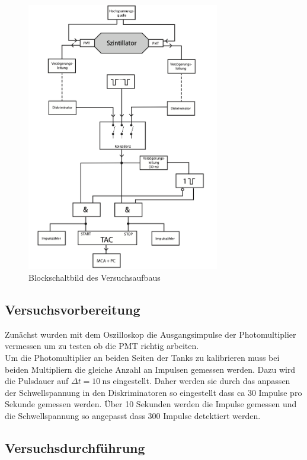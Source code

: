 \begin{figure}[H]
    \centering
    \includegraphics[width = 0.75\textwidth]{./bilder/Schaltbild.png}
    \caption{Blockschaltbild des Versuchsaufbaus \cite{anleitung}}
    \label{fig:schaltbild}
\end{figure}
\subsection{Versuchsvorbereitung}
Zunächst wurden mit dem Oszilloskop die Ausgangsimpulse der Photomultiplier vermessen um zu testen ob die PMT richtig arbeiten.\\
Um die Photomultiplier an beiden Seiten der Tanks zu kalibrieren muss bei beiden Multipliern die gleiche Anzahl an Impulsen gemessen werden.
Dazu wird die Pulsdauer auf $\Delta t = \SI{10}{\nano\second}$  eingestellt.
Daher werden sie durch das anpassen der Schwellspannung in den Diskriminatoren so eingestellt dass ca 30 Impulse pro Sekunde gemessen werden.
Über 10 Sekunden werden die Impulse gemessen und die Schwellspannung so angepasst dass 300 Impulse detektiert werden.


\subsection{Versuchsdurchführung}